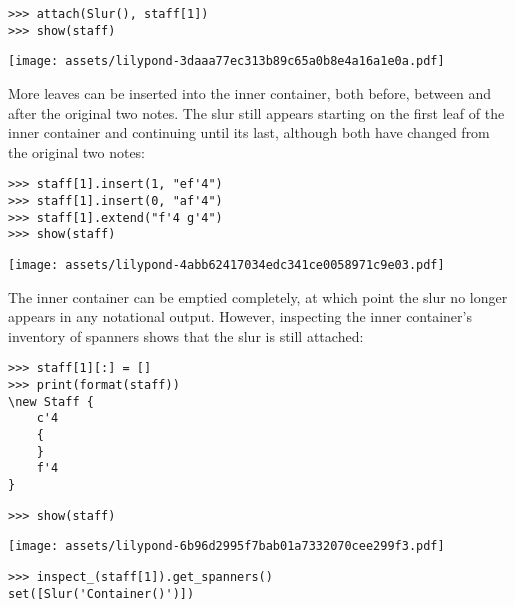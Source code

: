 \begin{abjadbookoutput}
\begin{singlespacing}
\vspace{-0.5\baselineskip}
\begin{verbatim}
>>> attach(Slur(), staff[1])
>>> show(staff)
\end{verbatim}
\noindent\texttt{[image: assets/lilypond-3daaa77ec313b89c65a0b8e4a16a1e0a.pdf]}
\end{singlespacing}
\end{abjadbookoutput}

\noindent More leaves can be inserted into the inner container, both before,
between and after the original two notes. The slur still appears starting on
the first leaf of the inner container and continuing until its last, although
both have changed from the original two notes:

\begin{comment}
<abjad>
staff[1].insert(1, "ef'4")
staff[1].insert(0, "af'4")
staff[1].extend("f'4 g'4")
show(staff)
</abjad>
\end{comment}

\begin{abjadbookoutput}
\begin{singlespacing}
\vspace{-0.5\baselineskip}
\begin{verbatim}
>>> staff[1].insert(1, "ef'4")
>>> staff[1].insert(0, "af'4")
>>> staff[1].extend("f'4 g'4")
>>> show(staff)
\end{verbatim}
\noindent\texttt{[image: assets/lilypond-4abb62417034edc341ce0058971c9e03.pdf]}
\end{singlespacing}
\end{abjadbookoutput}

\noindent The inner container can be emptied completely, at which point the
slur no longer appears in any notational output. However, inspecting the inner
container's inventory of spanners shows that the slur is still attached:

\begin{comment}
<abjad>
staff[1][:] = []
print(format(staff))
show(staff)
inspect_(staff[1]).get_spanners()
</abjad>
\end{comment}

\begin{abjadbookoutput}
\begin{singlespacing}
\vspace{-0.5\baselineskip}
\begin{verbatim}
>>> staff[1][:] = []
>>> print(format(staff))
\new Staff {
    c'4
    {
    }
    f'4
}
\end{verbatim}
\begin{verbatim}
>>> show(staff)
\end{verbatim}
\noindent\texttt{[image: assets/lilypond-6b96d2995f7bab01a7332070cee299f3.pdf]}
\begin{verbatim}
>>> inspect_(staff[1]).get_spanners()
set([Slur('Container()')])
\end{verbatim}
\end{singlespacing}
\end{abjadbookoutput}

